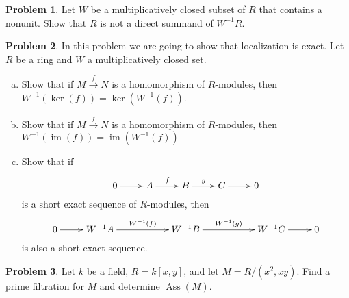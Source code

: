 \documentclass[11pt]{article}
\DeclareMathOperator{\Ass}{Ass}
\DeclareMathOperator{\im}{im}
\theoremstyle{definition}
\newtheorem{problem}{Problem}
\begin{document}
\vfill

\begin{problem}
	Let $W$ be a multiplicatively closed subset of $R$ that contains a nonunit. Show that $R$ is not a direct summand of $W^{-1}R$.
\end{problem}

\vfill

\begin{problem}
	In this problem we are going to show that localization is exact. Let $R$ be a ring and $W$ a multiplicatively closed set.
	\begin{enumerate}[a)]
		\item Show that if $M \xrightarrow{f} N$ is a homomorphism of $R$-modules, then $W^{-1}(\ker(f)) = \ker(W^{-1}(f))$. 
		\item Show that if $M \xrightarrow{f} N$ is a homomorphism of $R$-modules, then $W^{-1}(\im(f)) = \im(W^{-1}(f))$
		\item Show that if
		$$\xymatrix{0 \ar[r] & A \ar[r]^-{f} & B \ar[r]^-{g} & C \ar[r] & 0}$$ 
		is a short exact sequence of $R$-modules, then 
		$$\xymatrix{0 \ar[r] & W^{-1}A \ar[rr]^-{W^{-1}(f)} && W^{-1}B \ar[rr]^-{W^{-1}(g)} && W^{-1}C \ar[r] & 0}$$
		is also a short exact sequence.
	\end{enumerate}
\end{problem}

\vfill

\begin{problem}
	Let $k$ be a field, $R = k[x,y]$, and let $M = R/(x^2,xy)$. Find a prime filtration for $M$ and determine $\Ass(M)$.
\end{problem}
\end{document}
